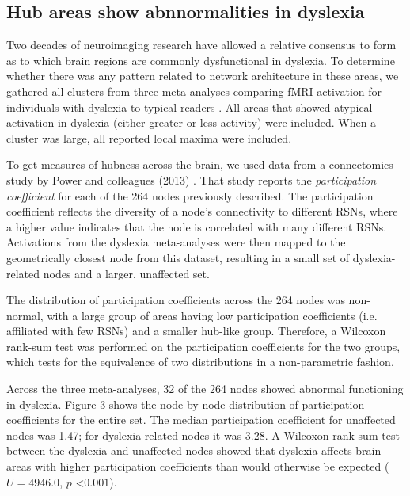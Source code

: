 \subsection{Hub areas show abnnormalities in dyslexia}
Two decades of neuroimaging research have allowed a relative consensus to form as to which brain regions are commonly dysfunctional in dyslexia. To determine whether there was any pattern related to network architecture in these areas, we gathered all clusters from three meta-analyses comparing fMRI activation for individuals with dyslexia to typical readers \citep{Maisog2008, Richlan2009, Paulesu2014}. All areas that showed atypical activation in dyslexia (either greater or less activity) were included. When a cluster was large, all reported local maxima were included. 

To get measures of hubness across the brain, we used data from a connectomics study by Power and colleagues (2013) \citep{Power2013}. That study reports the \textit{participation coefficient} for each of the 264 nodes previously described. The participation coefficient reflects the diversity of a node's connectivity to different RSNs, where a higher value indicates that the node is correlated with many different RSNs. Activations from the dyslexia meta-analyses were then mapped to the geometrically closest node from this dataset, resulting in a small set of dyslexia-related nodes and a larger, unaffected set.

The distribution of participation coefficients across the 264 nodes was non-normal, with a large group of areas having low participation coefficients (i.e. affiliated with few RSNs) and a smaller hub-like group. Therefore, a Wilcoxon rank-sum test was performed on the participation coefficients for the two groups, which tests for the equivalence of two distributions in a non-parametric fashion.

Across the three meta-analyses, 32 of the 264 nodes showed abnormal functioning in dyslexia. Figure 3 shows the node-by-node distribution of participation coefficients for the entire set. The median participation coefficient for unaffected nodes was 1.47; for dyslexia-related nodes it was 3.28. A Wilcoxon rank-sum test between the dyslexia and unaffected nodes showed that dyslexia affects brain areas with higher participation coefficients than would otherwise be expected ($U = 4946.0$, $p$ \textless $0.001$). 

